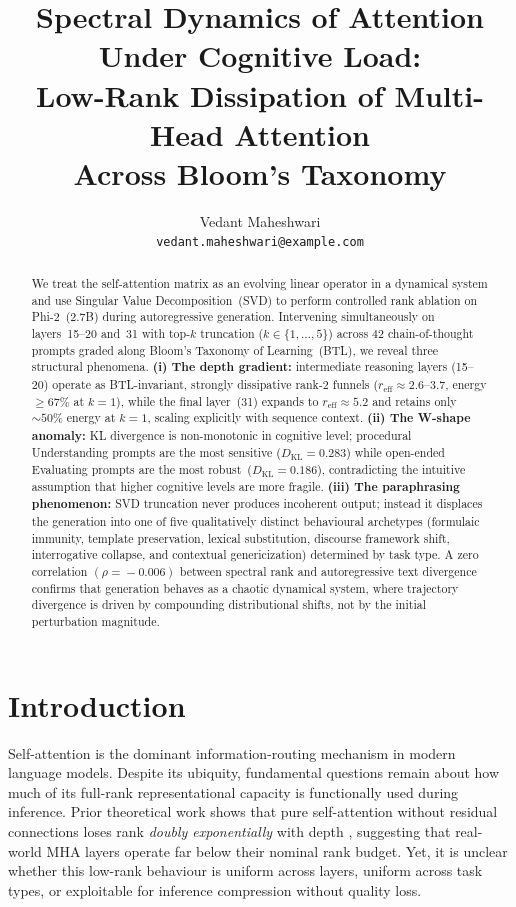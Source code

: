 \documentclass{article}
\title{Spectral Dynamics of Attention Under Cognitive Load:\\
       Low-Rank Dissipation of Multi-Head Attention\\
       Across Bloom's Taxonomy}
\author{%
  Vedant Maheshwari \\
  \texttt{vedant.maheshwari@example.com}
}
\begin{document}
\maketitle

\begin{abstract}
We treat the self-attention matrix as an evolving linear operator in a
dynamical system and use Singular Value Decomposition~(SVD) to perform
controlled rank ablation on Phi-2~(2.7B) during autoregressive generation.
Intervening simultaneously on layers~15--20 and~31 with top-$k$ truncation
($k\!\in\!\{1,\ldots,5\}$) across 42 chain-of-thought prompts graded along
Bloom's Taxonomy of Learning~(BTL), we reveal three structural phenomena.
\textbf{(i) The depth gradient:} intermediate reasoning layers (15--20) operate
as BTL-invariant, strongly dissipative rank-2 funnels
($r_{\text{eff}}\!\approx\!2.6$--$3.7$, energy ${\geq}67\%$ at $k\!=\!1$),
while the final layer~(31) expands to $r_{\text{eff}}\!\approx\!5.2$ and retains
only $\sim\!50\%$ energy at $k\!=\!1$, scaling explicitly with sequence context.
\textbf{(ii) The W-shape anomaly:} KL divergence is non-monotonic in cognitive
level; procedural Understanding prompts are the most sensitive ($D_\text{KL}\!=\!0.283$)
while open-ended Evaluating prompts are the most robust~($D_\text{KL}\!=\!0.186$),
contradicting the intuitive assumption that higher cognitive levels are more fragile.
\textbf{(iii) The paraphrasing phenomenon:} SVD truncation never produces incoherent
output; instead it displaces the generation into one of five qualitatively
distinct behavioural archetypes (formulaic immunity, template preservation,
lexical substitution, discourse framework shift, interrogative collapse, and
contextual genericization) determined by task type.
A zero correlation $(\rho\!=\!{-}0.006)$ between spectral rank and
autoregressive text divergence confirms that generation behaves as a
chaotic dynamical system, where trajectory divergence is driven by
compounding distributional shifts, not by the initial perturbation magnitude.
\end{abstract}

\section{Introduction}
\label{sec:intro}

Self-attention \citep{vaswani2017attention} is the dominant information-routing
mechanism in modern language models.  Despite its ubiquity, fundamental questions
remain about how much of its full-rank representational capacity is functionally
used during inference.  Prior theoretical work shows that pure self-attention without
residual connections loses rank \emph{doubly exponentially} with depth
\citep{dong2021attention}, suggesting that real-world MHA layers operate far below
their nominal rank budget.  Yet, it is unclear whether this low-rank behaviour is
uniform across layers, uniform across task types, or exploitable for inference
compression without quality loss.
\end{document}
